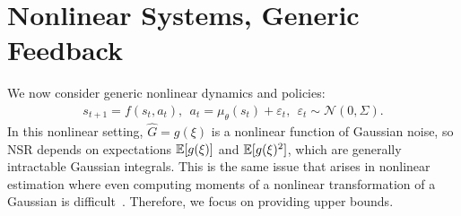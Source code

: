\vspace{-2mm}
\section{Nonlinear Systems, Generic Feedback}
\label{sec:nonlinear_new}

We now consider generic nonlinear dynamics and policies:
\begin{align}\label{eq:nonlinear-dynamics-reward}
s_{t+1}\!=f(s_t,a_t),~~a_t\!=\mu_\theta(s_t) + \varepsilon_t,~~
  \varepsilon_t \sim \mathcal N(0,\Sigma).\!\!
\end{align}
In this nonlinear setting, $\widehat G=g(\xi)$ is a nonlinear function of Gaussian noise, so NSR depends on expectations
${\mathbb{E}}[g(\xi)]$ and ${\mathbb{E}}[g(\xi)^2]$, which are generally intractable Gaussian integrals. This is the same issue that arises in nonlinear estimation where even computing moments of a nonlinear transformation of a Gaussian is difficult~\cite{julier04proceedings-nonlinearestimation}. Therefore, we focus on providing upper bounds.

